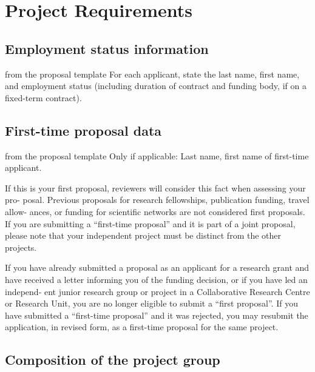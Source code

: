 \section{Project Requirements }

\subsection{Employment status information }

\begin{todo}{from the proposal template}
For each applicant, state the last name, first name, and employment status (including
duration of contract and funding body, if on a fixed-term contract).
\end{todo}

\subsection{First-time proposal data }

\begin{todo}{from the proposal template}
Only if applicable: Last name, first name of first-time applicant.

If this is your first proposal, reviewers will consider this fact when assessing your pro-
posal. Previous proposals for research fellowships, publication funding, travel allow-
ances, or funding for scientific networks are not considered first proposals. If you are
submitting a “first-time proposal” and it is part of a joint proposal, please note that your
independent project must be distinct from the other projects.

If you have already submitted a proposal as an applicant for a research grant and have
received a letter informing you of the funding decision, or if you have led an independ-
ent junior research group or project in a Collaborative Research Centre or Research
Unit, you are no longer eligible to submit a “first proposal”. If you have submitted a
“first-time proposal” and it was rejected, you may resubmit the application, in revised
form, as a first-time proposal for the same project.
\end{todo}

\subsection{Composition of the project group }


